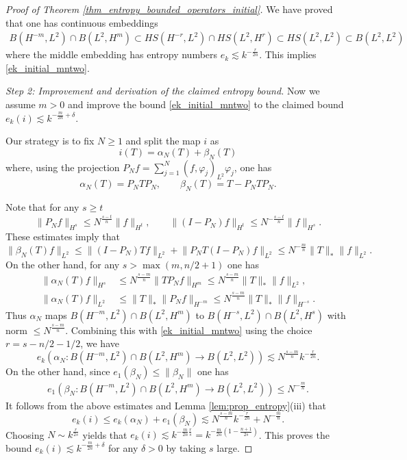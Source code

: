 \documentclass[10pt,a4paper]{amsart}
\newcommand{\norm}[1]{\lVert #1 \rVert}         %
\renewcommand{\geq}{\geqslant}
\renewcommand{\leq}{\leqslant}
\begin{document}
\begin{proof}[Proof of Theorem \ref{thm_entropy_bounded_operators_initial}]
We have proved that one has continuous embeddings 
\begin{align}
\label{eq:z0}
B(H^{-m}, L^2) \cap B(L^2, H^m) \subset HS(H^{-r}, L^2) \cap HS(L^2, H^r) \subset HS(L^2, L^2) \subset B(L^2, L^2)
\end{align}
where the middle embedding has entropy numbers  $e_k \lesssim k^{-\frac{r}{2n}}$. This implies \eqref{ek_initial_mntwo}.

\emph{Step 2: Improvement and derivation of the claimed entropy bound.}
Now we assume $m > 0$ and improve the bound \eqref{ek_initial_mntwo} to the claimed bound $e_k(i) \lesssim k^{-\frac{m}{2n}+\delta}$. 
  
Our strategy is to fix $N \geq 1$ and split the map $i$ as 
\[
i(T) = \alpha_N(T) + \beta_N(T)
\]
where, using the projection $P_N f = \sum_{j=1}^N (f, \varphi_j)_{L^2} \varphi_j$, one has 
\[
\alpha_N(T) = P_N T P_N, \qquad \beta_N(T) = T - P_N T P_N.
\]
  
Note that for any $s \geq t$ 
\[
\norm{P_N f}_{H^s} \leq N^{\frac{s-t}{n}} \norm{f}_{H^t}, \qquad \norm{(I - P_N) f}_{H^t} \leq N^{-\frac{s-t}{n}} \norm{f}_{H^s}.
\]
These estimates imply that 
\[
\norm{\beta_N(T) f}_{L^2} \leq \norm{(I - P_N) T f}_{L^2} + \norm{P_N T(I - P_N) f}_{L^2} \leq N^{-\frac{m}{n}} \norm{T}_{*} \norm{f}_{L^2}.
\]
On the other hand, for any $s > \max(m, n/2+1)$ one has 
\begin{align*}
\norm{\alpha_N(T) f}_{H^s} &\leq N^{\frac{s-m}{n}} \norm{T P_N f}_{H^m} \leq N^{\frac{s-m}{n}} \norm{T}_* \norm{f}_{L^2}, \\
\norm{\alpha_N(T) f}_{L^2} &\leq \norm{T}_* \norm{P_N f}_{H^{-m}} \leq N^{\frac{s-m}{n}} \norm{T}_* \norm{f}_{H^{-s}}.
\end{align*}
Thus $\alpha_N$ maps $B(H^{-m}, L^2) \cap B(L^2, H^m)$ to $B(H^{-s},L^2) \cap B(L^2, H^s)$ with norm $\leq N^{\frac{s-m}{n}}$. Combining this with \eqref{ek_initial_mntwo} using the choice $r = s - n/2 - 1/2$, we have 
\[
e_k(\alpha_N: B(H^{-m}, L^2) \cap B(L^2, H^m) \to B(L^2, L^2)) \lesssim N^{\frac{s-m}{n}} k^{-\frac{r}{2n}}.
\]
On the other hand, since $e_1(\beta_N) \leq \norm{\beta_N}$ one has 
\begin{align*}
e_1(\beta_N: B(H^{-m}, L^2) \cap B(L^2, H^m) \to B(L^2, L^2)) \leq N^{-\frac{m}{n}}.
\end{align*}
It follows from the above estimates and Lemma \ref{lem:prop_entropy}(iii) that 
\[
e_k(i) \leq e_k(\alpha_N) + e_1(\beta_N) \lesssim N^{\frac{s-m}{n}} k^{-\frac{r}{2n}} + N^{-\frac{m}{n}}.
\]
Choosing $N \sim k^{\frac{r}{2s}}$ yields that $e_k(i) \lesssim k^{-\frac{m}{2n} \frac{r}{s}} = k^{-\frac{m}{2n} (1-\frac{n+1}{2s})}$. This proves the bound $e_k(i) \lesssim k^{-\frac{m}{2n}+\delta}$ for any $\delta > 0$ by taking $s$ large.
\end{proof}
\end{document}
